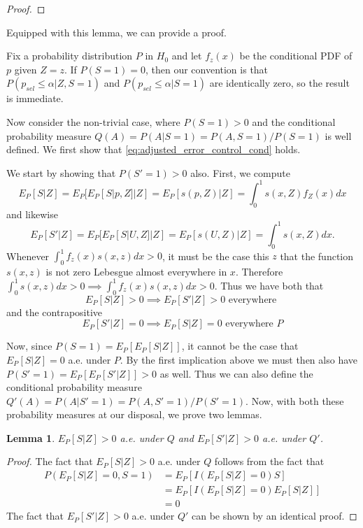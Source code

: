 \documentclass{article}
\newtheorem{lemma}{Lemma}
\begin{document}
\begin{appendix}
\begin{proof}
\end{proof}

Equipped with this lemma, we can provide a proof. 

Fix a probability distribution $P$ in $H_0$ and let $f_z(x)$ be the conditional PDF of $p$ given $Z=z$. If $P(S=1) = 0$, then our convention is that $P(p_{sel} \leq \alpha | Z, S=1)$ and $P(p_{sel} \leq \alpha | S=1)$ are identically zero, so the result is immediate. 

Now consider the non-trivial case, where $P(S=1) > 0$ and the conditional probability measure $Q(A)= P(A | S=1) = P(A, S=1)/P(S=1)$ is well defined. We first show that \eqref{eq:adjusted_error_control_cond} holds. 

We start by showing that $P(S'=1) > 0$ also. First, we compute 
\begin{equation*}
    E_P[S | Z] = E_P[ E_P[S|p, Z]| Z] = E_P[s(p, Z)| Z] = \int_0^1  s(x, Z)f_Z(x) dx 
\end{equation*}
and likewise
\begin{equation*}
    E_P[S' | Z] = E_P[ E_P[S|U, Z]| Z] = E_P[s(U, Z)| Z] = \int_0^1 s(x, Z) dx. 
\end{equation*}
Whenever $\int_0^1 f_z(x) s(x, z) dx > 0$, it must be the case this $z$ that the function $s(x, z)$ is not zero Lebesgue almost everywhere in $x$. Therefore $\int_0^1 s(x, z) dx > 0 \implies \int_0^1 f_z(x) s(x, z) dx > 0 $. Thus we have both that 
\begin{equation*}
    E_P[S|Z] > 0 \implies E_P[S'| Z] > 0 \text{ everywhere } 
\end{equation*}
and the contrapositive
\begin{equation*}
    E_P[S'|Z] = 0 \implies E_P[S| Z] = 0 \text{ everywhere } P 
\end{equation*}

Now, since $P(S = 1) = E_P[E_P[S| Z]]$, it cannot be the case that $E_P[S|Z] = 0$ a.e. under $P$.  By the first implication above we must then also have $P(S' = 1) = E_P[E_P[S'| Z]] > 0$ as well. Thus we can also define the conditional probability measure $Q'(A) = P(A | S'=1) = P(A, S'=1)/P(S'=1)$. Now, with both these probability measures at our disposal, we prove two lemmas. 

\begin{lemma}
    \label{lem:pos_selection}
    $E_P[S|Z]> 0$ a.e. under $Q$ and $E_P[S'|Z] > 0$ a.e. under $Q'$.
\end{lemma}

\begin{proof}
    The fact that $E_P[S|Z]> 0$ a.e. under $Q$ follows from the fact that 
    \begin{align*}
        P(E_P[S| Z] = 0, S=1) &= E_P[ I(E_P[S| Z] = 0) S] \\
                            &= E_P[ I(E_P[S| Z] = 0) E_P[S |Z]] \\
                            &= 0
    \end{align*}
    The fact that $E_P[S'|Z] > 0$ a.e. under $Q'$ can be shown by an identical proof. 
    

\end{proof}
\end{appendix}
\end{document}
